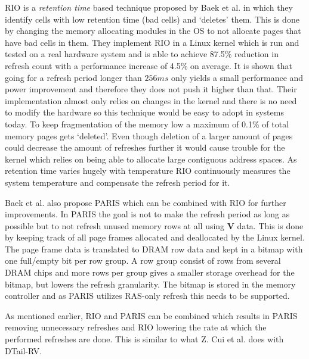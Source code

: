 RIO is a \textit{retention time} based technique proposed by Baek et al. \cite{rioparis} in which they identify cells with low retention time (bad cells) and `deletes' them. This is done by changing the memory allocating modules in the OS to not allocate pages that have bad cells in them. They implement RIO in a Linux kernel which is run and tested on a real hardware system and is able to achieve 87.5\% reduction in refresh count with a performance increase of 4.5\% on average. It is shown that going for a refresh period longer than \(256ms\) only yields a small performance and power improvement and therefore they does not push it higher than that. Their implementation almost only relies on changes in the kernel and there is no need to modify the hardware so this technique would be easy to adopt in systems today. To keep fragmentation of the memory low a maximum of 0.1\% of total memory pages gets `deleted'. Even though deletion of a larger amount of pages could decrease the amount of refreshes further it would cause trouble for the kernel which relies on being able to allocate large contiguous address spaces. As retention time varies hugely with temperature RIO continuously measures the system temperature and compensate the refresh period for it. 

Baek et al. also propose PARIS \cite{rioparis} which can be combined with RIO for further improvements. In PARIS the goal is not to make the refresh period as long as possible but to not refresh unused memory rows at all using \textbf{V} data. This is done by keeping track of all page frames allocated and deallocated by the Linux kernel. The page frame data is translated to DRAM row data and kept in a bitmap with one full/empty bit per row group. A row group consist of rows from several DRAM chips and more rows per group gives a smaller storage overhead for the bitmap, but lowers the refresh granularity. The bitmap is stored in the memory controller and as PARIS utilizes RAS-only refresh this needs to be supported. 

As mentioned earlier, RIO and PARIS can be combined which results in PARIS removing unnecessary refreshes and RIO lowering the rate at which the performed refreshes are done. This is similar to what Z. Cui et al. does with DTail-RV. 